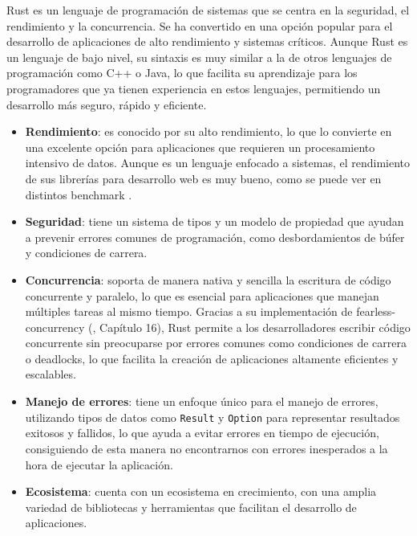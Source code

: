 Rust es un lenguaje de programación de sistemas que se centra en la seguridad, el rendimiento y la concurrencia. Se ha convertido en una opción popular para el desarrollo de aplicaciones de alto rendimiento y sistemas críticos.
Aunque Rust es un lenguaje de bajo nivel, su sintaxis es muy similar a la de otros lenguajes de programación como C++ o Java, lo que facilita su aprendizaje para los programadores que ya tienen experiencia en estos lenguajes, permitiendo un desarrollo más seguro, rápido y eficiente.

\begin{itemize}
    \item \textbf{Rendimiento}: es conocido por su alto rendimiento, lo que lo convierte en una excelente opción para aplicaciones que requieren un procesamiento intensivo de datos. Aunque es un lenguaje enfocado a sistemas, el rendimiento de sus librerías para desarrollo web es muy bueno, como se puede ver en distintos benchmark \parencite{rust-benchmark}.
    \item \textbf{Seguridad}: tiene un sistema de tipos y un modelo de propiedad que ayudan a prevenir errores comunes de programación, como desbordamientos de búfer y condiciones de carrera.
    \item \textbf{Concurrencia}: soporta de manera nativa y sencilla la escritura de código concurrente y paralelo, lo que es esencial para aplicaciones que manejan múltiples tareas al mismo tiempo.
        Gracias a su implementación de \gls{fearless-concurrency} (\cite{rustbook2024}, Capítulo 16), Rust permite a los desarrolladores escribir código concurrente sin preocuparse por errores comunes como condiciones de carrera o deadlocks, lo que facilita la creación de aplicaciones altamente eficientes y escalables.
    \item \textbf{Manejo de errores}: tiene un enfoque único para el manejo de errores, utilizando tipos de datos como \texttt{Result} y \texttt{Option} para representar resultados exitosos y fallidos, lo que ayuda a evitar errores en tiempo de ejecución, consiguiendo de esta manera no encontrarnos con errores inesperados a la hora de ejecutar la aplicación.
    \item \textbf{Ecosistema}: cuenta con un ecosistema en crecimiento, con una amplia variedad de bibliotecas y herramientas que facilitan el desarrollo de aplicaciones.
\end{itemize}


